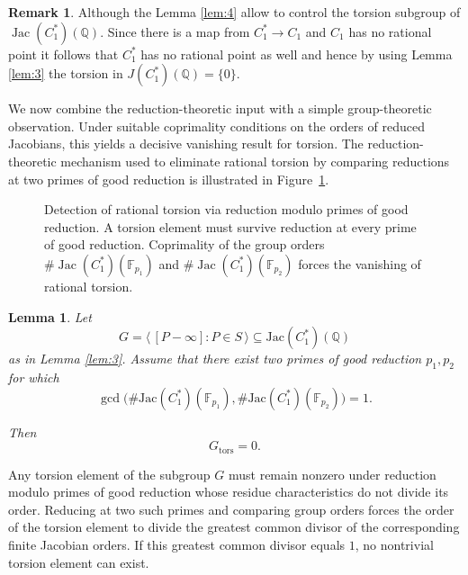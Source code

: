 \documentclass[12pt, reqno]{amsart}
\newtheorem{lemma}[thm]{Lemma}
\numberwithin{equation}{section}
\theoremstyle{definition}
\newtheorem{remark}[thm]{Remark}
\theoremstyle{nodefstyle}
\newcommand{\Jac}{\operatorname{Jac}}
\begin{document}
\begin{remark}
Although the Lemma \autoref{lem:4} allow to control the torsion subgroup of $\Jac(C_1^*)(\mathbb Q)$. Since there is a map from $C_1^*\to C_1 $ and $C_1$ has no rational point it follows that $C_1^*$ has no rational point as well and hence by using Lemma \autoref{lem:3} the torsion in $J(C_1^*)(\mathbb Q)=\{0\}$.
\end{remark}

We now combine the reduction-theoretic input with a simple group-theoretic observation. Under suitable coprimality conditions on the orders of reduced Jacobians, this yields a decisive vanishing result for torsion.
The reduction-theoretic mechanism used to eliminate rational torsion by comparing reductions
at two primes of good reduction is illustrated in
Figure~\ref{fig:torsion-reduction}.

\begin{figure}[htbp]
\centering
{}
\caption{Detection of rational torsion via reduction modulo primes of good reduction.
A torsion element must survive reduction at every prime of good reduction.
Coprimality of the group orders
$\#\Jac(C_1^\ast)(\mathbb{F}_{p_1})$ and
$\#\Jac(C_1^\ast)(\mathbb{F}_{p_2})$
forces the vanishing of rational torsion.}
\label{fig:torsion-reduction}
\end{figure}

\begin{lemma}\label{lem:5}
Let
\[
G = \langle\,[P-\infty]: P\in S\,\rangle
\subseteq \mathrm{Jac}(C_1^*)(\mathbb Q)
\]
as in Lemma \autoref{lem:3}.
Assume that there exist two primes of good reduction \(p_1,p_2\) for which
\[
\gcd\bigl(\#\mathrm{Jac}(C_1^*)(\mathbb F_{p_1}),
          \#\mathrm{Jac}(C_1^*)(\mathbb F_{p_2})\bigr)=1.
\]

Then
\[
G_{\mathrm{tors}} = 0.
\]
\end{lemma}
Any torsion element of the subgroup $G$ must remain nonzero under reduction modulo primes of good reduction whose residue characteristics do not divide its order. 
Reducing at two such primes and comparing group orders forces the order of the torsion element to divide the greatest common divisor of the corresponding finite Jacobian orders. 
If this greatest common divisor equals $1$, no nontrivial torsion element can exist.
\end{document}
